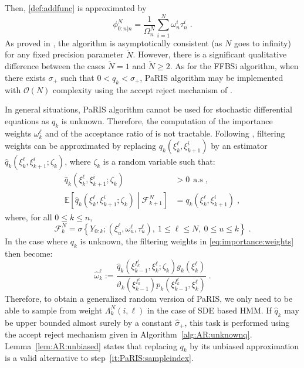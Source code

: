\documentclass[12pt]{article}
\newcommand{\eqsp}{\;}
\newcommand{\1}{\mathrm{1}}
\newcommand{\qk}{q_{k}}
\begin{document}
Then, \eqref{def:addfunc} is approximated by
\[
\phi_{0:n\vert n}^N = \frac{1}{\Omega_n^N}\sum_{i=1}^N \omega^{i}_n \tau_n^i\eqsp.
\] 
As proved in \cite{olsson:westerborn:2016}, the algorithm is asymptotically consistent (as $N$ goes to infinity) for any fixed precision parameter $\tilde N$. However, there is a significant qualitative difference between the cases $\tilde{N} = 1$ and $\tilde{N} \geq 2$. As for the FFBSi algorithm,  when there exists $\sigma_+$ such that $0<\qk <\sigma_+$, PaRIS algorithm may be implemented with $\mathcal{O}(N)$ complexity using the accept reject mechanism of \cite{douc:garivier:moulines:olsson:2011}.

In general situations, PaRIS algorithm cannot be used for stochastic differential equations as $\qk$ is unknown. Therefore, the computation of the importance weights $\omega_{k}^{\ell}$ and of the acceptance ratio of \cite{douc:garivier:moulines:olsson:2011} is not tractable. Following \cite{fearnhead:papaspiliopoulos:roberts:2008,olsson:strojby:2011}, filtering weights can be approximated by replacing $\qk(\xi^{\ell}_{k},\xi_{k+1}^{i})$  by an  estimator $\widehat{q}_k(\xi^{\ell}_{k},\xi_{k+1}^{i};\zeta_k)$, where $\zeta_k$ is a random variable such that:
\begin{align*}
\widehat{q}_k(\xi^{\ell}_{k},\xi_{k+1}^{i};\zeta_k)&> 0~~\text{a.s}\eqsp,\\
\mathbb{E}\left[\widehat{q}_k(\xi^{\ell}_{k},\xi_{k+1}^{i};\zeta_k)\middle| \mathcal{F}_{k+1}^N\right] &= \qk(\xi^{\ell}_{k},\xi_{k+1}^{i})\eqsp,
\end{align*}
where, for all $0\le k \le n$, 
\[
\mathcal{F}_{k}^N = \sigma\left\{Y_{0:k};(\xi^{\ell}_{u},\omega^{\ell}_{u},\tau^{\ell}_{u}),~1\le \ell\le N,~0\le u\le k\right\}\eqsp.
\]
In the case where $\qk$ is unknown, the filtering weights in \eqref{eq:importance:weights} then become:
\begin{equation}
\label{eq:random:weight}
\widehat{\omega}^{\ell}_k := \frac{\widehat{q}_k(\xi_{k-1}^{I^{\ell}_k},\xi^{\ell}_k;\zeta_k)g_k(\xi^{\ell}_k)}{\vartheta_k(\xi^{I^{\ell}_k}_{k-1}) p_k (\xi_{k-1}^{I^{\ell}_k},\xi^{\ell}_k)}\eqsp.
\end{equation}
Therefore, to obtain a generalized random version of PaRIS, we only need to be able to sample from weight $\Lambda_k^N(i,\ell)$ in the case of SDE based HMM. If $\widehat{q}_k$ may be upper bounded almost surely by a constant $\hat{\sigma}_+$, this task is performed using the accept reject mechanism given in Algorithm~\ref{alg:AR:unknownq}. Lemma~\ref{lem:AR:unbiased} states that replacing  $\qk$ by its unbiased approximation is a valid alternative to step~\eqref{it:PaRIS:sampleindex}.\\
\end{document}
